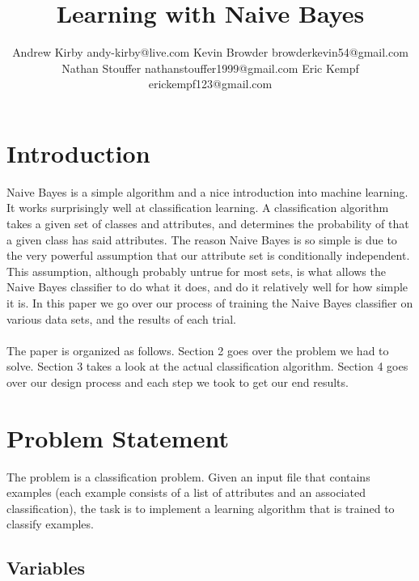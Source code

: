 \documentclass[twoside,11pt]{article}
\begin{document}
\title{Learning with Naive Bayes}

\author{\name Andrew Kirby \email andy-kirby@live.com \AND
		\name Kevin Browder \email browderkevin54@gmail.com \AND
		\name Nathan Stouffer \email nathanstouffer1999@gmail.com \AND
		\name Eric Kempf \email erickempf123@gmail.com }
	
\maketitle

\begin{abstract}
	
\end{abstract}

\section{Introduction}

Naive Bayes is a simple algorithm and a nice introduction into machine learning. It works surprisingly well at classification learning. A classification algorithm takes a given set of classes and attributes, and determines the probability of that a given class has said attributes. The reason Naive Bayes is so simple is due to the very powerful assumption that our attribute set is conditionally independent. This assumption, although probably untrue for most sets, is what allows the Naive Bayes classifier to do what it does, and do it relatively well for how simple it is. In this paper we go over our process of training the Naive Bayes classifier on various data sets, and the results of each trial. \\\\
The paper is organized as follows. Section 2 goes over the problem we had to solve. Section 3 takes a look at the actual classification algorithm. Section 4 goes over our design process and each step we took to get our end results.

\section{Problem Statement}

The problem is a classification problem. Given an input file that contains examples (each example consists of a list of attributes and an associated classification), the task is to implement a learning algorithm that is trained to classify examples.

\subsection{Variables}
\end{document}
